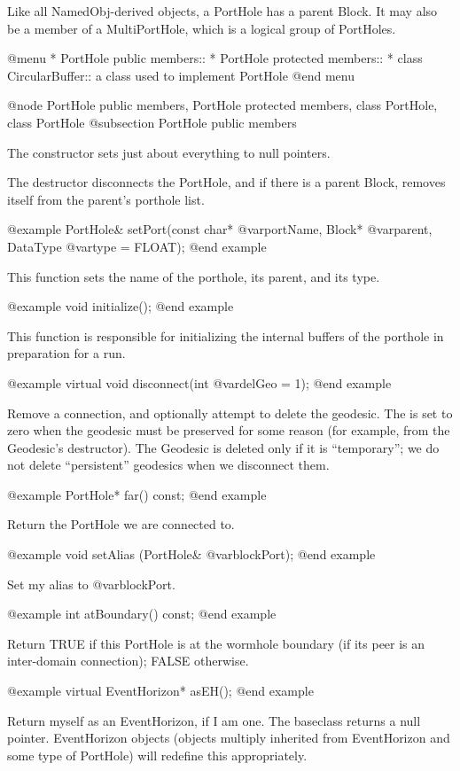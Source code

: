 Like all NamedObj-derived objects, a PortHole has a parent Block.  It
may also be a member of a MultiPortHole, which is a logical group of
PortHoles.

@menu
* PortHole public members::
* PortHole protected members::
* class CircularBuffer::        a class used to implement PortHole
@end menu

@node PortHole public members, PortHole protected members, class PortHole, class PortHole
@subsection PortHole public members

The constructor sets just about everything to null pointers.

The destructor disconnects the PortHole, and if there is a parent Block,
removes itself from the parent's porthole list.

@example
PortHole& setPort(const char* @var{portName}, Block* @var{parent},
                 DataType @var{type} = FLOAT);
@end example

This function sets the name of the porthole, its parent, and
its type.

@example
void initialize();
@end example

This function is responsible for initializing the internal buffers
of the porthole in preparation for a run.

@example
virtual void disconnect(int @var{delGeo} = 1);
@end example

Remove a connection, and optionally attempt to delete the geodesic.  The
is set to zero when the geodesic must be preserved for some reason (for
example, from the Geodesic's destructor).  The Geodesic is deleted only
if it is ``temporary''; we do not delete ``persistent'' geodesics when
we disconnect them.

@example
PortHole* far() const;
@end example

Return the PortHole we are connected to.

@example
void setAlias (PortHole& @var{blockPort});
@end example

Set my alias to @var{blockPort}.

@example
int atBoundary() const;
@end example

Return TRUE if this PortHole is at the wormhole boundary (if its peer is
an inter-domain connection); FALSE otherwise.

@example
virtual EventHorizon* asEH();
@end example

Return myself as an EventHorizon, if I am one.  The baseclass returns
a null pointer.  EventHorizon objects (objects multiply inherited from
EventHorizon and some type of PortHole) will redefine this
appropriately.

